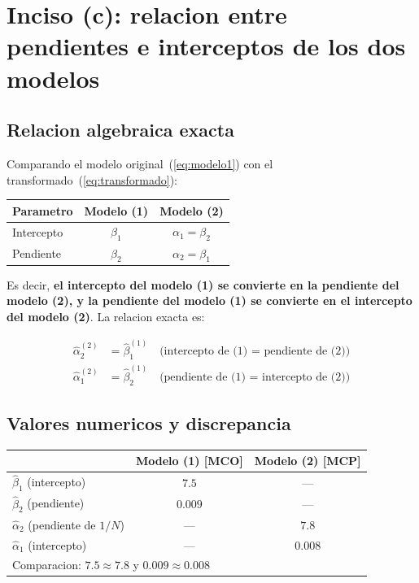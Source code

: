 \documentclass[12pt, letterpaper]{article}
\theoremstyle{remark}
\begin{document}
\section{Inciso (c): relacion entre pendientes e interceptos de los dos modelos}

\subsection{Relacion algebraica exacta}

Comparando el modelo original~(\ref{eq:modelo1}) con el transformado~(\ref{eq:transformado}):

\begin{center}
\begin{tabular}{lcc}
\toprule
\textbf{Parametro} & \textbf{Modelo (1)} & \textbf{Modelo (2)} \\
\midrule
Intercepto & $\beta_1$ & $\alpha_1 = \beta_2$ \\
Pendiente  & $\beta_2$ & $\alpha_2 = \beta_1$ \\
\bottomrule
\end{tabular}
\end{center}

\vspace{6pt}

Es decir, \textbf{el intercepto del modelo (1) se convierte en la pendiente del
modelo (2), y la pendiente del modelo (1) se convierte en el intercepto del
modelo (2)}. La relacion exacta es:

\begin{align}
  \hat\alpha_2^{(2)} &= \hat\beta_1^{(1)} \quad \text{(intercepto de (1) = pendiente de (2))}
  \label{eq:rel1}\\
  \hat\alpha_1^{(2)} &= \hat\beta_2^{(1)} \quad \text{(pendiente de (1) = intercepto de (2))}
  \label{eq:rel2}
\end{align}

\subsection{Valores numericos y discrepancia}

\begin{center}
\small
\begin{tabular}{lcc}
\toprule
& \textbf{Modelo (1) [MCO]} & \textbf{Modelo (2) [MCP]} \\
\midrule
$\hat\beta_1$ (intercepto) & $7.5$ & --- \\
$\hat\beta_2$ (pendiente)  & $0.009$ & --- \\
$\hat\alpha_2$ (pendiente de $1/N$) & --- & $7.8$ \\
$\hat\alpha_1$ (intercepto) & --- & $0.008$ \\
\midrule
\multicolumn{3}{l}{Comparacion: $7.5 \approx 7.8$ y $0.009 \approx 0.008$} \\
\bottomrule
\end{tabular}
\end{center}
\end{document}
